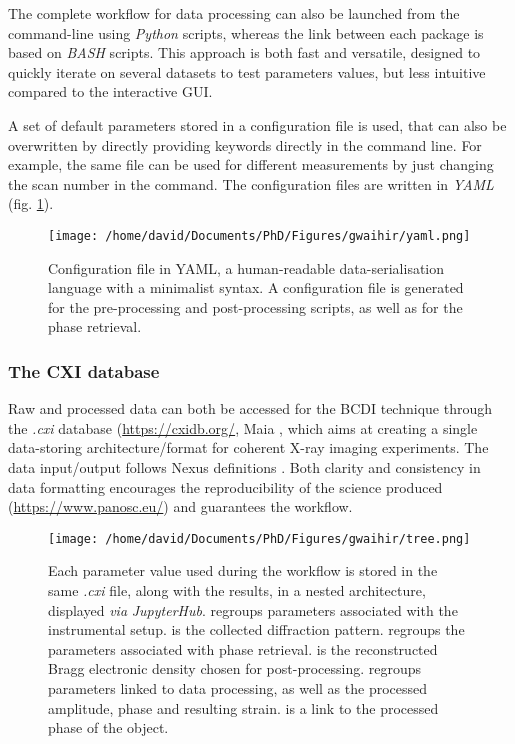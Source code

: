 The complete workflow for data processing can also be launched from the command-line using \textit{Python} scripts, whereas the link between each package is based on \textit{BASH} scripts.
This approach is both fast and versatile, designed to quickly iterate on several datasets to test parameters values, but less intuitive compared to the interactive GUI.

A set of default parameters stored in a configuration file is used, that can also be overwritten by directly providing keywords directly in the command line.
For example, the same file can be used for different measurements by just changing the scan number in the command.
The configuration files are written in \textit{YAML} (fig. \ref{fig:YAML_file}).

\begin{figure}[!htb]
    \centering
    \texttt{[image: /home/david/Documents/PhD/Figures/gwaihir/yaml.png]}
    \caption{
    Configuration file in YAML, a human-readable data-serialisation language with a minimalist syntax.
    A configuration file is generated for the pre-processing and post-processing scripts, as well as for the phase retrieval.
    }
    \label{fig:YAML_file}
\end{figure}

\subsubsection{The CXI database}

Raw and processed data can both be accessed for the BCDI technique through the \textit{.cxi} database (\url{https://cxidb.org/}, Maia \cite*{Maia2012}, which aims at creating a single data-storing architecture/format for coherent X-ray imaging experiments.
The data input/output follows Nexus definitions \parencite{Konnecke2015}.
Both clarity and consistency in data formatting encourages the reproducibility of the science produced (\url{https://www.panosc.eu/}) and guarantees the workflow.

\begin{figure}[!htb]
    \centering
    \texttt{[image: /home/david/Documents/PhD/Figures/gwaihir/tree.png]}
    \caption{
    Each parameter value used during the workflow is stored in the same \textit{.cxi} file, along with the results, in a nested architecture, displayed \textit{via} \textit{JupyterHub}.
     regroups parameters associated with the instrumental setup.
     is the collected diffraction pattern.
     regroups the parameters associated with phase retrieval.
     is the reconstructed Bragg electronic density chosen for post-processing.
     regroups parameters linked to data processing, as well as the processed amplitude, phase and resulting strain.
     is a link to the processed phase of the object.
    }
    \label{fig:TREE}
\end{figure}

